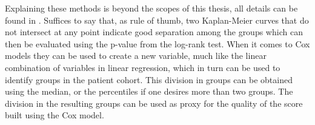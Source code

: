 Explaining these methods is beyond the scopes of this thesis, all details can be found in \cite{SurvivalAnalysis}.
Suffices to say that, as rule of thumb, two Kaplan-Meier curves that do not intersect at any point indicate good separation among the groups which can then be evaluated using the p-value from the log-rank test.
When it comes to Cox models they can be used to create a new variable, much like the linear combination of variables in linear regression, which in turn can be used to identify groups in the patient cohort. This division in groups can be obtained using the median, or the percentiles if one desires more than two groups. 
The division in the resulting groups can be used as proxy for the quality of the score built using the Cox model.








